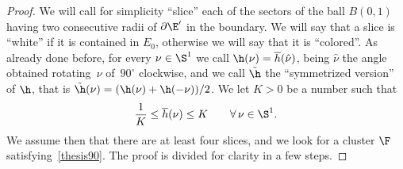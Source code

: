 \begin{proof}
We will call for simplicity ``slice'' each of the sectors of the ball $B(0,1)$ having two consecutive radii of $\partial\E'$ in the boundary. We will say that a slice is ``white'' if it is contained in $E_0$, otherwise we will say that it is ``colored''. As already done before, for every $\nu\in\S^1$ we call $\h(\nu)=\overline h(\hat\nu)$, being $\hat\nu$ the angle obtained rotating~$\nu$ of~$90^\circ$ clockwise, and we call $\tilde\h$ the ``symmetrized version'' of $\h$, that is $\tilde \h(\nu)=(\h(\nu)+\nobreak\h(-\nu))/2$. We let $K>0$ be a number such that
\begin{equation}\label{largeK}
\frac 1K \leq \overline h(\nu)\leq K \qquad \forall\, \nu\in\S^1.
\end{equation}
We assume then that there are at least four slices, and we look for a cluster $\F$ satisfying~\eqref{thesis90}. The proof is divided for clarity in a few steps.

\end{proof}

